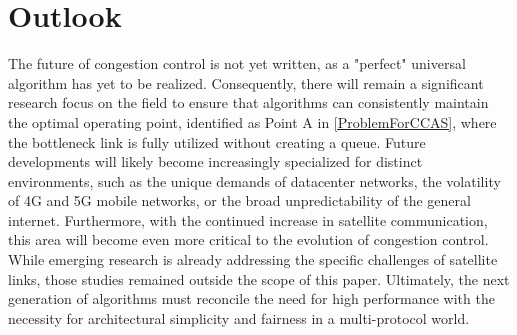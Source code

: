 \section{Outlook}\label{sec:Outlook}

The future of congestion control is not yet written, as a "perfect" universal algorithm has yet to be realized. 
Consequently, there will remain a significant research focus on the field to ensure that algorithms can consistently maintain the optimal operating point, identified as Point A in \ref{ProblemForCCAS}, where the bottleneck link is fully utilized without creating a queue. 
Future developments will likely become increasingly specialized for distinct environments, such as the unique demands of datacenter networks, the volatility of 4G and 5G mobile networks, or the broad unpredictability of the general internet. 
Furthermore, with the continued increase in satellite communication, this area will become even more critical to the evolution of congestion control. 
While emerging research is already addressing the specific challenges of satellite links, those studies remained outside the scope of this paper. 
Ultimately, the next generation of algorithms must reconcile the need for high performance with the necessity for architectural simplicity and fairness in a multi-protocol world.
